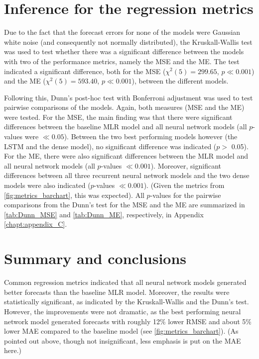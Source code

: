 \section{Inference for the regression metrics}
\label{sec:inference}

Due to the fact that the forecast errors for none of the models were Gaussian white noise (and consequently not normally distributed), the Kruskall-Wallis test was used to test whether there was a significant difference between the models with two of the performance metrics, namely the MSE and the ME. The test indicated a significant difference, both for the MSE ($\chi^2(5) = 299.65$, $p\ll0.001$) and the ME ($\chi^2(5) = 593.40$, $p\ll0.001$), between the different models. 

Following this, Dunn's post-hoc test with Bonferroni adjustment was used to test pairwise comparisons of the models. Again, both measures (MSE and the ME) were tested. For the MSE, the main finding was that there were significant differences between the baseline MLR model and all neural network models (all $p$-values were $\ll0.05$). Between the two best performing models however (the LSTM and the dense model), no significant difference was indicated ($p> $ 0.05). For the ME, there were also significant differences between the MLR model and all neural network models (all $p$-values $\ll0.001$). Moreover, significant differences between all three recurrent neural network models and the two dense models were also indicated ($p$-values $\ll0.001$). (Given the metrics from \cref{fig:metrics_barchart}, this was expected). All $p$-values for the pairwise comparisons from the Dunn's test for the MSE and the ME are summarized in \cref{tab:Dunn_MSE} and \cref{tab:Dunn_ME}, respectively, in Appendix \ref{chapt:appendix_C}. 

\section{Summary and conclusions}
Common regression metrics indicated that all neural network models generated better forecasts than the baseline MLR model. Moreover, the results were statistically significant, as indicated by the Kruskall-Wallis and the Dunn's test. However, the improvements were not dramatic, as the best performing neural network model generated forecasts with roughly 12\% lower RMSE and about 5\% lower MAE compared to the baseline model (see \cref{fig:metrics_barchart}). (As pointed out above, though not insignificant, less emphasis is put on the MAE here.) 

